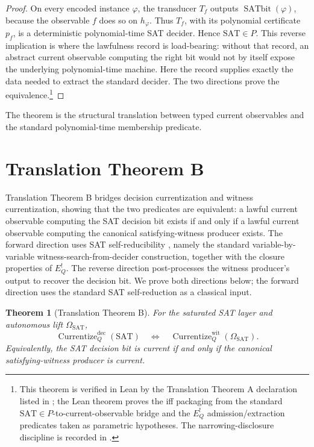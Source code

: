 \documentclass[11pt]{article}
\newcommand{\EQbang}{E^{!}_{Q}}
\newcommand{\OmegaSAT}{\Omega_{\mathrm{SAT}}}
\newcommand{\SATbit}{\operatorname{SATbit}}
\newcommand{\CurrentizeDec}{\operatorname{Currentize}^{\mathrm{dec}}_{Q}}
\newcommand{\CurrentizeWit}{\operatorname{Currentize}^{\mathrm{wit}}_{Q}}
\newtheorem{theorem}{Theorem}[section]
\theoremstyle{definition}
\begin{document}
\begin{proof}
On every encoded instance \(\varphi\), the transducer \(T_f\) outputs
\(\SATbit(\varphi)\), because the observable \(f\) does so on
\(h_\varphi\).  Thus \(T_f\), with its polynomial certificate \(p_f\),
is a deterministic polynomial-time SAT decider.  Hence
\(\mathrm{SAT}\in P\).  This reverse implication is where the
lawfulness record is load-bearing: without that record, an abstract
current observable computing the right bit would not by itself expose
the underlying polynomial-time machine.  Here the record supplies
exactly the data needed to extract the standard decider.  The two
directions prove the equivalence.\footnote{This theorem is verified in
Lean by the Translation Theorem A declaration listed in
; the Lean theorem proves the iff packaging
from the standard
\(\mathrm{SAT}\in P\)-to-current-observable bridge and the \(\EQbang\)
admission/extraction predicates taken as parametric hypotheses.  The
narrowing-disclosure discipline is recorded in
.}
\end{proof}

The theorem is the structural translation between typed current
observables and the standard polynomial-time membership predicate.
 

\section{Translation Theorem B}
\label{sec:translation-b}

Translation Theorem B bridges decision currentization and witness
currentization, showing that the two predicates are equivalent: a
lawful current observable computing the SAT decision bit exists if
and only if a lawful current observable computing the canonical
satisfying-witness producer exists.  The
forward direction uses SAT self-reducibility
\citep{Schoening1986ComplexityStructure,HemaspaandraOgihara2002SelfReducibility,Selman1988SelfReducible},
namely the standard variable-by-variable witness-search-from-decider
construction, together with the closure properties of \(\EQbang\).  The reverse direction
post-processes the witness producer's output to recover the decision
bit.  We prove both directions below; the forward direction uses the
standard SAT self-reduction as a classical input.

\begin{theorem}[Translation Theorem B]
\label{thm:translation-B}
For the saturated SAT layer and autonomous lift \(\OmegaSAT\),
\[
  \CurrentizeDec(\mathrm{SAT})
  \quad\Longleftrightarrow\quad
  \CurrentizeWit(\OmegaSAT).
\]
Equivalently, the SAT decision bit is current if and only if the
canonical satisfying-witness producer is current.
\end{theorem}
\end{document}
